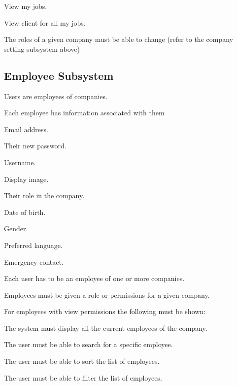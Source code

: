 \documentclass{article}
\begin{document}
\begin{list}{R.}{}
\begin{list}{R.}{}
\begin{list}{R...}{}
				\item View my jobs.
				\item View client for all my jobs.
			\end{list}
		\end{list} 
		\item The roles of a given company must be able to change (refer to the company setting subsystem above)
	\end{list}
	
	\subsection*{Employee Subsystem}	
	\begin{list}{R.}{}
		\item Users are employees of companies.
		\item Each employee has information associated with them 
			\begin{list}{R..}{}
			\item Email address.
			\item Their new password. 
			\item Username.
			\item Display image.
			\item Their role in the company.
			\item Date of birth.
			\item Gender.
			\item Preferred language.
			\item Emergency contact. 
		\end{list} 
		\item Each user has to be an employee of one or more companies. 
		\item Employees must be given a role or permissions for a given company.
		\item For employees with view permissions the following must be shown: 
		\begin{list}{R.}{}
			\item The system must display all the current employees of the company.
			\item The user must be able to search for a specific employee.
			\item The user must be able to sort the list of employees.
			\item The user must be able to filter the list of employees.

\end{list}
\end{list}
\end{document}
